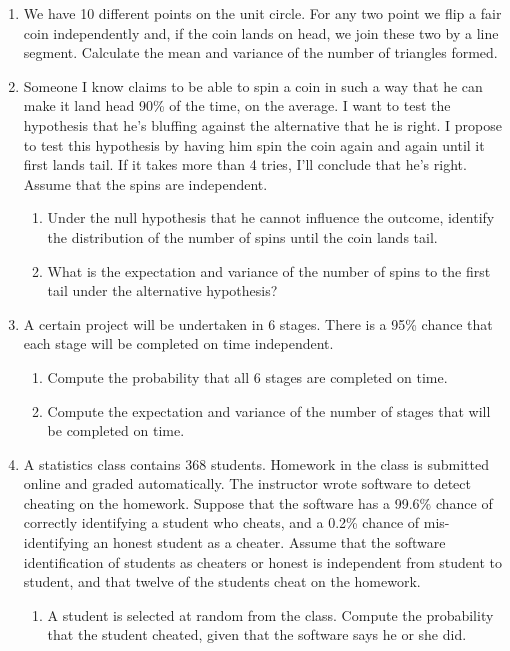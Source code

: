 \documentclass[12pt]{article}%
\newcommand{\0}{{\bf 0}}
\begin{document}
\begin{enumerate}
 




\item
We have 10 different points on the unit circle.
For any two point
we flip a fair coin independently and,
if the coin lands on head, we join these two by a line segment.
Calculate the mean and variance of the number of triangles formed. 




\item
Someone I know claims to be able to spin a coin in such a way that he can make it land head 90\% of the time, on the average. I want to test the hypothesis that he's bluffing against the alternative that he is right. I propose to test this hypothesis by having him spin the coin again and again until it first lands tail. If it takes more than 4 tries, I'll conclude that he's right. Assume that the spins are independent.
\begin{enumerate}
\item
Under the null hypothesis that he cannot influence the outcome, 
identify the distribution of the number of spins until the coin lands tail.





\item
What is the expectation and variance of the number of spins to the first tail under the alternative hypothesis?


\end{enumerate}





\item
A certain project will be undertaken in 6 stages. There is a 95\% chance that each stage will be completed on time independent.
\begin{enumerate}
\item
Compute the probability that all 6 stages are completed on time.


\item
Compute the expectation and variance of the number of stages that will be completed on time.

\end{enumerate}




\item
A statistics class contains 368 students. Homework in the class is submitted online and graded automatically. The instructor wrote software to detect cheating on the homework. Suppose that the software has a 99.6\% chance of correctly identifying a student who cheats, and a 0.2\% chance of mis-identifying an honest student as a cheater. Assume that the software identification of students as cheaters or honest is independent from student to student, and that twelve of the students cheat on the homework.
\begin{enumerate}
\item A student is selected at random from the class. Compute the probability that the student cheated, given that the software says he or she did.
\\
{\color{blue}{\bf Sol.}}





\end{enumerate}
\end{enumerate}
\end{document}

